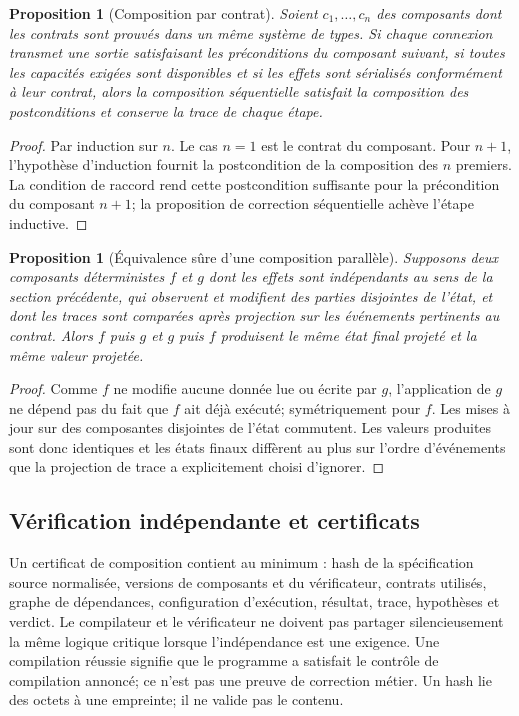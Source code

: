 \documentclass[11pt,a4paper]{article}
\theoremstyle{definition}
\theoremstyle{plain}
\newtheorem{proposition}[definition]{Proposition}
\theoremstyle{remark}
\begin{document}
\begin{proposition}[Composition par contrat]
Soient $c_1,\ldots,c_n$ des composants dont les contrats sont prouvés dans un même système de types. Si chaque connexion transmet une sortie satisfaisant les préconditions du composant suivant, si toutes les capacités exigées sont disponibles et si les effets sont sérialisés conformément à leur contrat, alors la composition séquentielle satisfait la composition des postconditions et conserve la trace de chaque étape.
\end{proposition}
\begin{proof}
Par induction sur $n$. Le cas $n=1$ est le contrat du composant. Pour $n+1$, l'hypothèse d'induction fournit la postcondition de la composition des $n$ premiers. La condition de raccord rend cette postcondition suffisante pour la précondition du composant $n+1$; la proposition de correction séquentielle achève l'étape inductive.
\end{proof}

\begin{proposition}[Équivalence sûre d'une composition parallèle]
Supposons deux composants déterministes $f$ et $g$ dont les effets sont indépendants au sens de la section précédente, qui observent et modifient des parties disjointes de l'état, et dont les traces sont comparées après projection sur les événements pertinents au contrat. Alors $f$ puis $g$ et $g$ puis $f$ produisent le même état final projeté et la même valeur projetée.
\end{proposition}
\begin{proof}
Comme $f$ ne modifie aucune donnée lue ou écrite par $g$, l'application de $g$ ne dépend pas du fait que $f$ ait déjà exécuté; symétriquement pour $f$. Les mises à jour sur des composantes disjointes de l'état commutent. Les valeurs produites sont donc identiques et les états finaux diffèrent au plus sur l'ordre d'événements que la projection de trace a explicitement choisi d'ignorer.
\end{proof}

\subsection{Vérification indépendante et certificats}
Un certificat de composition contient au minimum : hash de la spécification source normalisée, versions de composants et du vérificateur, contrats utilisés, graphe de dépendances, configuration d'exécution, résultat, trace, hypothèses et verdict. Le compilateur et le vérificateur ne doivent pas partager silencieusement la même logique critique lorsque l'indépendance est une exigence. Une compilation réussie signifie que le programme a satisfait le contrôle de compilation annoncé; ce n'est pas une preuve de correction métier. Un hash lie des octets à une empreinte; il ne valide pas le contenu.
\end{document}
